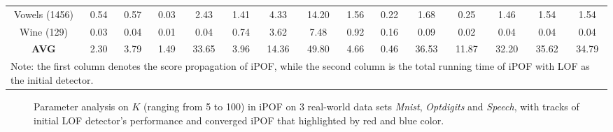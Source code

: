 \documentclass[sigconf,nonacm]{acmart}
\begin{document}
\begin{table*}[!t]
{\begin{tabular}{c||cc|ccc|cc||ccccccc}
    \multicolumn{1}{c||}{Vowels (1456)} & \multicolumn{1}{c}{0.54} & 0.57 & \multicolumn{1}{c}{0.03} & \multicolumn{1}{c}{2.43} &   \multicolumn{1}{c}{1.41} & \multicolumn{1}{c|}{4.33} & \multicolumn{1}{c}{14.20} & \multicolumn{1}{c||}{1.56} & \multicolumn{1}{c}{0.22} & \multicolumn{1}{c}{1.68} & \multicolumn{1}{c}{0.25} & \multicolumn{1}{c}{1.46} & \multicolumn{1}{c}{1.54} & \multicolumn{1}{c}{1.54}\\
    
    \multicolumn{1}{c||}{Wine (129)} & \multicolumn{1}{c}{0.03} &0.04 & \multicolumn{1}{c}{0.01} & \multicolumn{1}{c}{0.04} &   \multicolumn{1}{c}{0.74} & \multicolumn{1}{c|}{3.62} & \multicolumn{1}{c}{7.48} & \multicolumn{1}{c||}{0.92} & \multicolumn{1}{c}{0.16} & \multicolumn{1}{c}{0.09} & \multicolumn{1}{c}{0.02} & \multicolumn{1}{c}{0.04} & \multicolumn{1}{c}{0.04} & \multicolumn{1}{c}{0.04}\\
    \hline
    \multicolumn{1}{c||}{\textbf{AVG}} & \multicolumn{1}{c}{2.30}& 3.79 & \multicolumn{1}{c}{1.49} & \multicolumn{1}{c}{33.65} &   \multicolumn{1}{c}{3.96} & \multicolumn{1}{c|}{14.36} & \multicolumn{1}{c}{49.80} & \multicolumn{1}{c||}{4.66} & \multicolumn{1}{c}{0.46} & \multicolumn{1}{c}{36.53} & \multicolumn{1}{c}{11.87} & \multicolumn{1}{c}{32.20} & \multicolumn{1}{c}{35.62} & \multicolumn{1}{c}{34.79}\\
    \hline
    \multicolumn{15}{l}{Note: the first column denotes the score propagation of iPOF, while the second column is the total running time of iPOF with LOF as the initial detector.}\label{fig:time}\\
    \end{tabular}}
\end{table*}

\begin{figure*}[t]
  \centering
    \hspace{-6mm}
    \hspace{-6mm}

  \caption{Parameter analysis on $K$ (ranging from 5 to 100) in iPOF on 3 real-world data sets \textit{Mnist}, \textit{Optdigits} and \textit{Speech}, with tracks of initial LOF detector's performance and converged iPOF that highlighted by red and blue color.} \label{fig:K}
\end{figure*}
\end{document}
